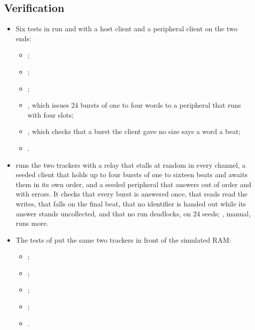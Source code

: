 \subsection*{Verification}

\begin{itemize}
\item Six tests in  run 
and  with a host client and a peripheral
client on the two ends:
\begin{itemize}
\item {};
\item {};
\item {};
\item {},
which issues 24 bursts of one to four words to a peripheral that
 runs with four slots;
\item {}, which checks that a
burst the client gave no size says a word a beat;
\item {}.
\end{itemize}
\item {} runs the two trackers with a relay that
stalls at random in every channel, a seeded client that holds up to
four bursts of one to sixteen beats and awaits them in its own order,
and a seeded peripheral that answers out of order and with errors. It
checks that every burst is answered once, that reads read the writes,
that  falls on the final beat, that no identifier is handed
out while its answer stands uncollected, and that no run deadlocks, on
24 seeds; , manual, runs more.
\item The tests of  put the same two trackers in
front of the simulated RAM:
\begin{itemize}
\item {};
\item {};
\item {};
\item {};
\item {}.

\end{itemize}
\end{itemize}

